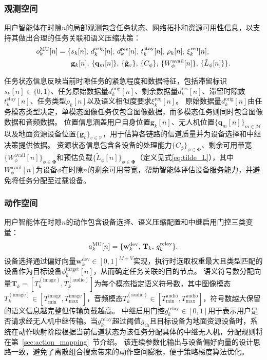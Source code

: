 \subsubsection{观测空间}
用户智能体在时隙$n$的局部观测包含任务状态、网络拓扑和资源可用性信息，以支持其做出合理的任务关联和语义压缩决策：
\begin{equation}
\begin{aligned}
    o_k^{\rm MU}[n] = \{&s_k[n],\, d_k^{\text{orig}}[n],\, d_k^{\text{res}}[n],\, t_k^{\text{stay}}[n],\, \rho_k[n],\, \xi_k^{\text{req}}[n],\\
    &\mathbf{g}_k[n],\, \{\mathbf{q}_m[n]\},\, \{\tilde{\mathbf{g}}_v\},\, \{C_\phi\},\, \{W_\phi^{\text{avail}}[n]\},\, \{\tilde{L}_\phi[n]\}\}.
\end{aligned}
\end{equation}

任务状态信息反映当前时隙任务的紧急程度和数据特征，包括滞留标识$s_k[n] \in \{0,1\}$、任务原始数据量$d_k^{\text{orig}}[n]$、剩余数据量$d_k^{\text{res}}[n]$、滞留时隙数$t_k^{\text{stay}}[n]$、任务类型$\rho_k[n]$以及语义相似度要求$\xi_k^{\text{req}}[n]$。
原始数据量$d_k^{\text{orig}}[n]$由任务模态类型决定，单模态图像任务仅包含图像数据，而多模态任务则同时包含图像数据和音频数据。
位置信息涵盖用户自身位置$\mathbf{g}_k[n]$、无人机位置$\{\mathbf{q}_m[n]\}_{m\in\mathcal{M}}$以及地面资源设备位置$\{\tilde{\mathbf{g}}_v\}_{v\in\mathcal{V}}$，用于估算各链路的信道质量并为设备选择和中继决策提供依据。
资源状态信息包含各设备的处理能力$\{C_\phi\}_{\phi\in\boldsymbol{\Phi}}$、剩余可用带宽$\{W_\phi^{\text{avail}}[n]\}_{\phi\in\boldsymbol{\Phi}}$和预估负载$\{\tilde{L}_\phi[n]\}_{\phi\in\boldsymbol{\Phi}}$（定义见式\eqref{eq:tilde_L}），其中$W_\phi^{\text{avail}}[n]$为设备$\phi$在时隙$n$的剩余可用带宽，帮助智能体评估设备服务能力，并避免将任务分配至过载设备。

\subsubsection{动作空间}

用户智能体在时隙$n$的动作包含设备选择、语义压缩配置和中继启用门控三类变量：
\begin{equation}
a_k^{\rm MU}[n] = \{\mathbf{w}_k^{\text{dev}},\, \mathbf{T}_k,\, g_k^{\text{relay}}\}.
\end{equation}
设备选择通过偏好向量$\mathbf{w}_k^{\text{dev}} \in [0,1]^{M+V}$实现，执行时选取权重最大且类型匹配的设备作为目标设备$\phi_k^{\text{target}}[n]$，从而确定任务关联的目的节点。
语义符号数分配向量$\mathbf{T}_k = [T_k^{(\text{image})}, T_k^{(\text{audio})}]$为每个模态指定语义符号数，其中图像模态$T_k^{(\text{image})} \in [T_{\min}^{\text{image}}, T_{\max}^{\text{image}}]$，音频模态$T_k^{(\text{audio})} \in [T_{\min}^{\text{audio}}, T_{\max}^{\text{audio}}]$，符号数越大保留的语义信息越完整但传输负载越高。
中继启用门控$g_k^{\text{relay}} \in [0,1]$用于表示用户是否请求经无人机中继传输。当$g_k^{\text{relay}}$超过阈值$g_{\text{th}}$且目标设备为地面资源设备时，系统在动作映射阶段根据当前信道状态为该任务分配具体的中继无人机，分配规则将在第~\ref{sec:action_mapping}~节介绍。
该连续参数化输出与设备偏好向量的设计思路一致，避免了离散组合搜索带来的动作空间膨胀，便于策略梯度算法优化。


